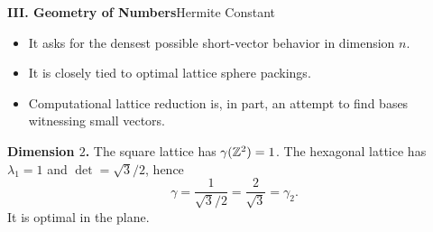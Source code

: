 \begin{frame}[shrink=8]{\textbf{III. Geometry of Numbers}}{Hermite Constant}
\begin{itemize}
  \item It asks for the densest possible short-vector behavior in dimension $n$.
  \item It is closely tied to optimal lattice sphere packings.
  \item Computational lattice reduction is, in part, an attempt to find bases witnessing small vectors.
\end{itemize}
\textbf{Dimension $2$.}\; The square lattice has $\gamma(\mathbb{Z}^2)=1$.
The hexagonal lattice has $\lambda_1=1$ and $\det=\sqrt3/2$, hence
\[
  \gamma=\frac{1}{\sqrt3/2}=\frac{2}{\sqrt3}=\gamma_2.
\]
It is optimal in the plane.
\end{frame}
